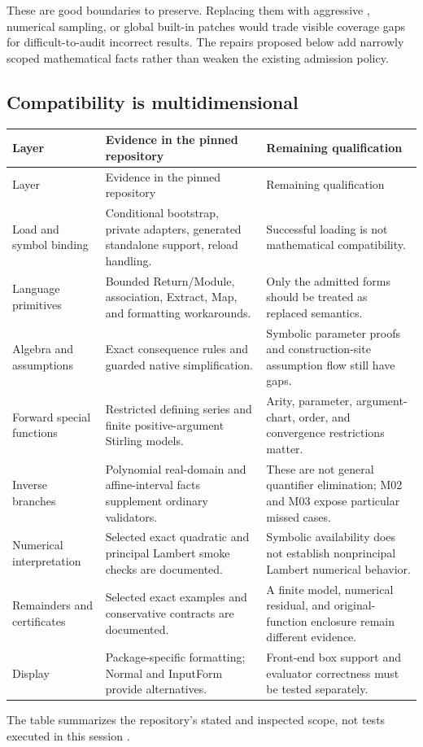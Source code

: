 \documentclass[11pt,a4paper]{article}
\newcommand{\code}[1]{\texttt{\detokenize{#1}}}
\theoremstyle{remark}
\begin{document}
These are good boundaries to preserve. Replacing them with aggressive \code{PowerExpand}, numerical sampling, or global built-in patches would trade visible coverage gaps for difficult-to-audit incorrect results. The repairs proposed below add narrowly scoped mathematical facts rather than weaken the existing admission policy.

\subsection{Compatibility is multidimensional}

\begin{longtable}{@{}L{29mm}L{67mm}L{50mm}@{}}
\toprule
Layer & Evidence in the pinned repository & Remaining qualification\\\midrule
\endfirsthead
\toprule Layer & Evidence in the pinned repository & Remaining qualification\\\midrule
\endhead
Load and symbol binding & Conditional bootstrap, private adapters, generated standalone support, reload handling. & Successful loading is not mathematical compatibility.\\
Language primitives & Bounded Return/Module, association, Extract, Map, and formatting workarounds. & Only the admitted forms should be treated as replaced semantics.\\
Algebra and assumptions & Exact consequence rules and guarded native simplification. & Symbolic parameter proofs and construction-site assumption flow still have gaps.\\
Forward special functions & Restricted defining series and finite positive-argument Stirling models. & Arity, parameter, argument-chart, order, and convergence restrictions matter.\\
Inverse branches & Polynomial real-domain and affine-interval facts supplement ordinary validators. & These are not general quantifier elimination; M02 and M03 expose particular missed cases.\\
Numerical interpretation & Selected exact quadratic and principal Lambert smoke checks are documented. & Symbolic availability does not establish nonprincipal Lambert numerical behavior.\\
Remainders and certificates & Selected exact examples and conservative contracts are documented. & A finite model, numerical residual, and original-function enclosure remain different evidence.\\
Display & Package-specific formatting; Normal and InputForm provide alternatives. & Front-end box support and evaluator correctness must be tested separately.\\
\bottomrule
\end{longtable}
\noindent The table summarizes the repository's stated and inspected scope, not tests executed in this session \cite{compatibility,mathicsformatting,mathicsbranches}.
\end{document}
